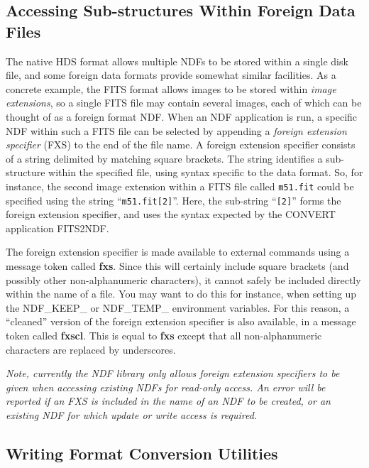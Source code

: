 \documentclass[11pt,twoside,nolof]{starlink}
\begin{document}
\subsection{\label{sect:fxs}Accessing Sub-structures Within Foreign Data Files}
The native HDS format allows multiple NDFs to be stored within a single disk
file, and some foreign data formats provide somewhat similar facilities.
As a concrete example, the FITS format allows images to be stored within
\emph{image extensions}, so a single FITS file may contain several images,
each of which can be thought of as a foreign format NDF. When an
NDF application is run, a specific NDF within such a FITS file can be
selected by appending a \emph{foreign extension specifier} (FXS) to the
end of the file name. A foreign extension specifier consists of a string
delimited by matching square brackets. The string identifies a sub-structure
within the specified file, using syntax specific to the data format. So,
for instance, the second image extension within a FITS file called \texttt{m51.fit} could be specified using the string ``\texttt{m51.fit[2]}''. Here, the
sub-string ``\texttt{[2]}'' forms the foreign extension specifier, and uses the
syntax expected by the CONVERT application FITS2NDF.

The foreign extension specifier is made available to external commands
using a message token called \textbf{fxs}. Since this will certainly include
square brackets (and possibly other non-alphanumeric characters), it
cannot safely be included directly within the name of a file. You may
want to do this for instance, when setting up the NDF\_KEEP\_  or
NDF\_TEMP\_ environment variables. For this reason, a ``cleaned'' version
of the foreign extension specifier is also available, in a message token
called \textbf{fxscl}. This is equal to \textbf{fxs} except that all
non-alphanumeric characters are replaced by underscores.

\begin{center}
\emph{Note, currently the NDF library only allows foreign extension specifiers
to be given when accessing existing NDFs for read-only access. An error
will be reported if an FXS is included in the name of an NDF to be
created, or an existing NDF for which update or write access is required.}
\end{center}

\subsection{\label{sect:conversionutilities}Writing Format Conversion Utilities}
\end{document}
